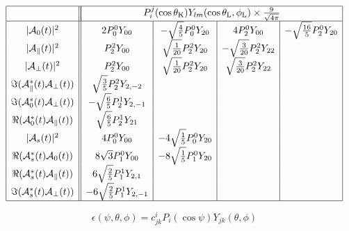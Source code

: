 \documentclass[a4paper,9pt,twoside]{article}
\def\thetaK{\theta_\mathrm{K}}
\def\thetaL{\theta_\mathrm{L}}
\def\phiL{\phi_\mathrm{L}}
\begin{document}
\begin{equation}
\begin{array}{|c|| c | c | c | c | }
 \hline
&\multicolumn{4}{|c|}{ P_i^j(\cos\thetaK)Y_{lm}(\cos\thetaL,\phiL) \times \frac{9}{\sqrt{4\pi}} } \\
 \hline
|{\cal A}_0(t)|^2                       & 2P_0^0Y_{00} & -\sqrt{\frac{4}{5}}P_0^0Y_{20} & 4P_2^0Y_{00} & -\sqrt{\frac{16}{5}} P_2^0Y_{20}  \\
|{\cal A}_\parallel(t)|^2               & P_2^2Y_{00} &\sqrt{\frac{1}{20}} P_2^2Y_{20} &-\sqrt{\frac{3}{20}}P_2^2Y_{22} & \\
|{\cal A}_\perp(t)|^2                   & P_2^2Y_{00} & \sqrt{\frac{1}{20}} P_2^2Y_{20} &\sqrt{\frac{3}{20}}P_2^2Y_{22} & \\
\Im({\cal A}_\parallel^*(t){\cal A}_\perp(t)) & \sqrt{\frac{3}{5}}P_2^2Y_{2,-2}&&&\\
\Im({\cal A}_0^*(t){\cal A}_\perp(t))         & -\sqrt{\frac{6}{5}}P_2^1Y_{2,-1}&&&\\
\Re({\cal A}_0^*(t){\cal A}_\parallel(t))     & \sqrt{\frac{6}{5}}P_2^1Y_{21}&&&\\
|{\cal A}_{s}(t)|^2                   &  4 P_0^0 Y_{00} & -4 \sqrt{\frac{1}{5}} P_0^0 Y_{20} && \\
\Re({\cal A}_{s}^*(t){\cal A}_0(t))   &  8 \sqrt{3} P_1^0 Y_{00} & -8 \sqrt{\frac{1}{5}} P_1^0 Y_{20} && \\
\Re({\cal A}_{s}^*(t){\cal A}_\parallel(t))   &  6\sqrt{\frac{2}{5}} P_1^1 Y_{2,1} &&& \\
\Im({\cal A}_{s}^*(t){\cal A}_\perp(t))     &  -6\sqrt{\frac{2}{5}} P_1^1 Y_{2,-1} &&& \\
 \hline
\end{array}
\end{equation}



\pagebreak
\begin{equation}
   \epsilon(\psi,\theta,\phi) = c^{i}_{jk} P_i(\cos\psi)Y_{jk}(\theta,\phi)
   \label{eq:eps_exp}
\end{equation}
\end{document}
